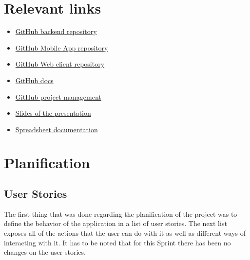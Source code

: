 \documentclass[./main.tex]{subfiles}
\begin{document}
\section{Relevant links}

\begin{itemize}
	\item \href{https://github.com/commed-it/backend}{GitHub backend repository}
	\item \href{https://github.com/commed-it/mobile-app}{GitHub Mobile App repository}
	\item \href{https://github.com/commed-it/web-client}{GitHub Web client repository}
	\item \href{https://github.com/commed-it/docs}{GitHub docs}
	\item \href{https://github.com/orgs/commed-it/projects/1}{GitHub project management}
	\item \href{https://drive.google.com/drive/folders/15iM-Fm6krEBcHkVyaqSUfjJMY1MKBMm6?usp=sharing}{Slides of the presentation}
	\item \href{https://docs.google.com/spreadsheets/d/1qyKpYXf7lZ2p7q09JHzv7e7yGVBiPEqGNHhwPsFYcXc/edit?usp=sharing}{Spreadsheet documentation}
\end{itemize}

\section{Planification}

\subsection{User Stories}

The first thing that was done regarding the planification of the project
was to define the behavior of the application in a list of user stories.
The next list exposes all of the actions that the user can do with it as
well as different ways of interacting with it. It has to be noted that for this Sprint 
there has been no changes on the user stories.
\end{document}
